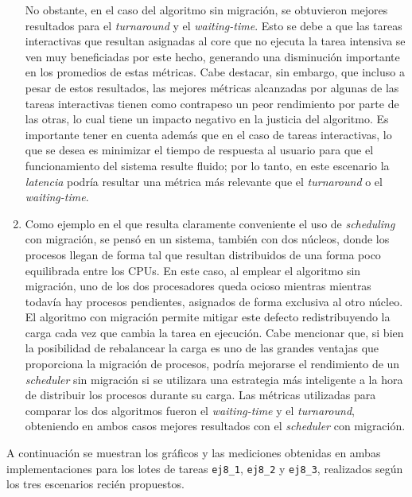 \begin{enumerate}
    No obstante, en el caso del algoritmo sin migración, se obtuvieron mejores
    resultados para el \emph{turnaround} y el \emph{waiting-time}. Esto se
    debe a que las tareas interactivas que resultan asignadas al core que no
    ejecuta la tarea intensiva se ven muy beneficiadas por este hecho,
    generando una disminución importante en los promedios de estas métricas.
    Cabe destacar, sin embargo, que incluso a pesar de estos resultados, las
    mejores métricas alcanzadas por algunas de las tareas interactivas tienen
    como contrapeso un peor rendimiento por parte de las otras, lo cual tiene
    un impacto negativo en la justicia del algoritmo. Es importante tener en
    cuenta además que en el caso de tareas interactivas, lo que se desea es
    minimizar el tiempo de respuesta al usuario para que el funcionamiento del
    sistema resulte fluido; por lo tanto, en este escenario la \emph{latencia}
    podría resultar una métrica más relevante que el \emph{turnaround} o el
    \emph{waiting-time}.

    \item Como ejemplo en el que resulta claramente conveniente el uso de
    \emph{scheduling} con migración, se pensó en un sistema, también con dos
    núcleos, donde los procesos llegan de forma tal que resultan distribuidos
    de una forma poco equilibrada entre los CPUs. En este caso, al emplear el
    algoritmo sin migración, uno de los dos procesadores queda ocioso mientras
    mientras todavía hay procesos pendientes, asignados de forma exclusiva al
    otro núcleo. El algoritmo con migración permite mitigar este defecto
    redistribuyendo la carga cada vez que cambia la tarea en ejecución. Cabe
    mencionar que, si bien la posibilidad de rebalancear la carga es uno de las
    grandes ventajas que proporciona la migración de procesos, podría
    mejorarse el rendimiento de un \emph{scheduler} sin migración si se
    utilizara una estrategia más inteligente a la hora de distribuir los
    procesos durante su carga. Las métricas utilizadas para comparar los dos
    algoritmos fueron el \emph {waiting-time} y el \emph{turnaround},
    obteniendo en ambos casos mejores resultados con el \emph{scheduler} con
    migración.
\end{enumerate}

A continuación se muestran los gráficos y las mediciones obtenidas en ambas
implementaciones para los lotes de tareas \texttt{ej8\_1}, \texttt{ej8\_2} y
\texttt{ej8\_3}, realizados según los tres escenarios recién propuestos.

